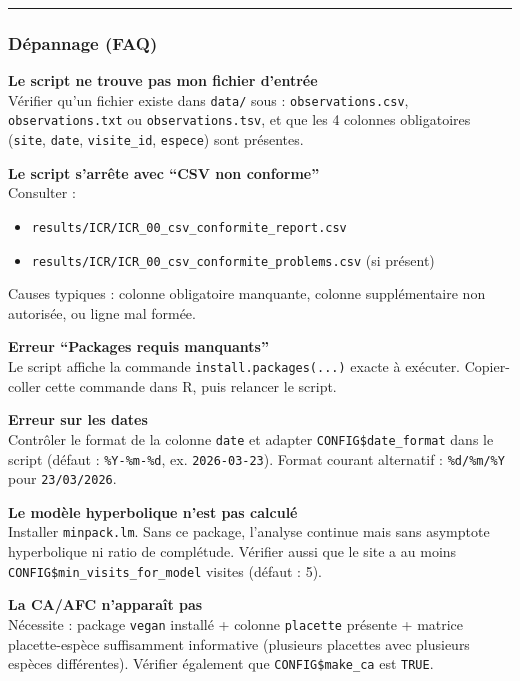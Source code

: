 \begin{center}\rule{0.5\linewidth}{0.5pt}\end{center}

\subsubsection{Dépannage (FAQ)}\label{duxe9pannage-faq}

\textbf{Le script ne trouve pas mon fichier d'entrée}\\
Vérifier qu'un fichier existe dans \texttt{data/} sous :
\texttt{observations.csv}, \texttt{observations.txt} ou
\texttt{observations.tsv}, et que les 4 colonnes obligatoires
(\texttt{site}, \texttt{date}, \texttt{visite\_id}, \texttt{espece})
sont présentes.

\textbf{Le script s'arrête avec ``CSV non conforme''}\\
Consulter :

\begin{itemize}
\tightlist
\item
  \texttt{results/ICR/ICR\_00\_csv\_conformite\_report.csv}
\item
  \texttt{results/ICR/ICR\_00\_csv\_conformite\_problems.csv} (si
  présent)
\end{itemize}

Causes typiques : colonne obligatoire manquante, colonne supplémentaire
non autorisée, ou ligne mal formée.

\textbf{Erreur ``Packages requis manquants''}\\
Le script affiche la commande \texttt{install.packages(...)} exacte à
exécuter. Copier-coller cette commande dans R, puis relancer le script.

\textbf{Erreur sur les dates}\\
Contrôler le format de la colonne \texttt{date} et adapter
\texttt{CONFIG\$date\_format} dans le script (défaut :
\texttt{\%Y-\%m-\%d}, ex. \texttt{2026-03-23}). Format courant
alternatif : \texttt{\%d/\%m/\%Y} pour \texttt{23/03/2026}.

\textbf{Le modèle hyperbolique n'est pas calculé}\\
Installer \texttt{minpack.lm}. Sans ce package, l'analyse continue mais
sans asymptote hyperbolique ni ratio de complétude. Vérifier aussi que
le site a au moins \texttt{CONFIG\$min\_visits\_for\_model} visites
(défaut : 5).

\textbf{La CA/AFC n'apparaît pas}\\
Nécessite : package \texttt{vegan} installé + colonne \texttt{placette}
présente + matrice placette-espèce suffisamment informative (plusieurs
placettes avec plusieurs espèces différentes). Vérifier également que
\texttt{CONFIG\$make\_ca} est \texttt{TRUE}.

